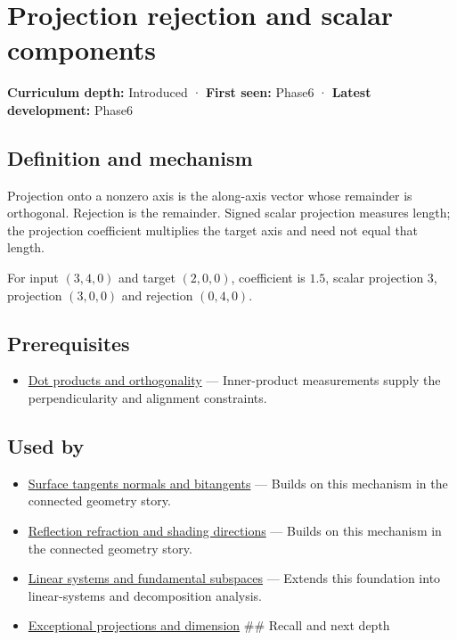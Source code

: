 \hypertarget{appendix-505a502c372a}{}\label{referencestart:appendix-505a502c372a}
\section{Projection rejection and scalar components}\label{appendix-505a502c372a-projection-rejection-and-scalar-components}

\textbf{Curriculum depth:} Introduced · \textbf{First seen:} Phase6 · \textbf{Latest development:} Phase6

\subsection{Definition and mechanism}\label{appendix-505a502c372a-definition-and-mechanism}

Projection onto a nonzero axis is the along-axis vector whose remainder is orthogonal. Rejection is the remainder. Signed scalar projection measures length; the projection coefficient multiplies the target axis and need not equal that length.

For input \((3,4,0)\) and target \((2,0,0)\), coefficient is \(1.5\), scalar projection \(3\), projection \((3,0,0)\) and rejection \((0,4,0)\).

\subsection{Prerequisites}\label{appendix-505a502c372a-prerequisites}

\begin{itemize}
\tightlist
\item
  \hyperref[appendix-8bc4e8fc547c]{Dot products and orthogonality} --- Inner-product measurements supply the perpendicularity and alignment constraints.
\end{itemize}

\subsection{Used by}\label{appendix-505a502c372a-used-by}

\begin{itemize}
\item
  \hyperref[appendix-e31893dec985]{Surface tangents normals and bitangents} --- Builds on this mechanism in the connected geometry story.
\item
  \hyperref[appendix-44e00863b4d5]{Reflection refraction and shading directions} --- Builds on this mechanism in the connected geometry story.
\item
  \hyperref[appendix-8572a4a060c1]{Linear systems and fundamental subspaces} --- Extends this foundation into linear-systems and decomposition analysis.
\item
  \hyperref[appendix-3c73f7862157]{Exceptional projections and dimension} \#\# Recall and next depth
\end{itemize}

